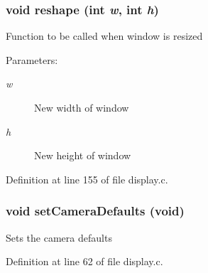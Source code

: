 \subsubsection{\setlength{\rightskip}{0pt plus 5cm}void reshape (int {\em w}, int {\em h})}\label{display_8h_a15}


Function to be called when window is resized

\begin{Desc}
\item[Parameters:]
\begin{description}
\item[{\em w}]New width of window \item[{\em h}]New height of window \end{description}
\end{Desc}


Definition at line 155 of file display.c.
\subsubsection{\setlength{\rightskip}{0pt plus 5cm}void set\-Camera\-Defaults (void)}\label{display_8h_a14}


Sets the camera defaults 

Definition at line 62 of file display.c.